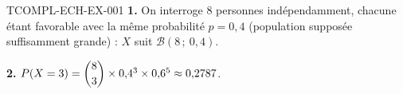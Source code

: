 \begin{corrige}{TCOMPL-ECH-EX-001}
\textbf{1.} On interroge $8$ personnes indépendamment, chacune étant favorable avec la même probabilité $p=0{,}4$ (population supposée suffisamment grande) : $X$ suit $\mathcal{B}(8\,;\ 0{,}4)$.

\textbf{2.} $P(X=3) = \dbinom{8}{3}\times0{,}4^3\times0{,}6^5 \approx 0{,}2787$.
\end{corrige}
